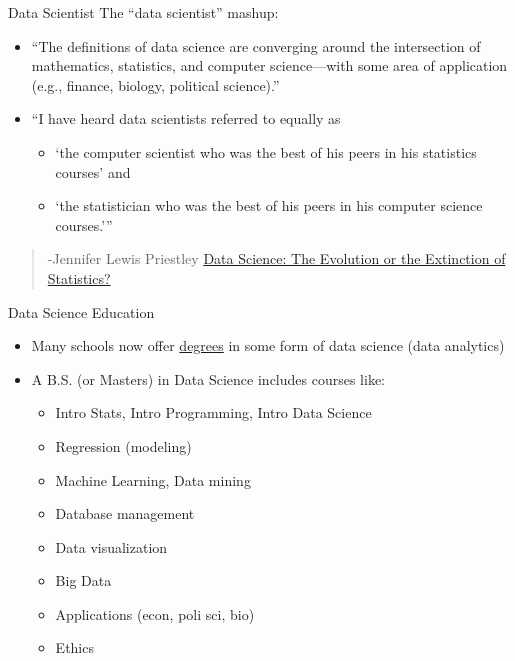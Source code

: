 \documentclass[
  10pt,
  ignorenonframetext,
]{beamer}
\providecommand{\tightlist}{%
  \setlength{\itemsep}{0pt}\setlength{\parskip}{0pt}}
\begin{document}
\begin{frame}{Data Scientist}
\protect\hypertarget{data-scientist}{}
The ``data scientist'' mashup:

\begin{itemize}
\tightlist
\item
  ``The definitions of data science are converging around the
  intersection of mathematics, statistics, and computer science---with
  some area of application (e.g., finance, biology, political
  science).''
\item
  ``I have heard data scientists referred to equally as

  \begin{itemize}
  \tightlist
  \item
    `the computer scientist who was the best of his peers in his
    statistics courses' and
  \item
    `the statistician who was the best of his peers in his computer
    science courses.'''
  \end{itemize}
\end{itemize}

\begin{quote}
-Jennifer Lewis Priestley
\href{http://magazine.amstat.org/blog/2016/01/01/data-science-the-evolution-or-the-extinction-of-statistics/}{Data
Science: The Evolution or the Extinction of Statistics?}
\end{quote}
\end{frame}

\begin{frame}{Data Science Education}
\protect\hypertarget{data-science-education}{}
\begin{itemize}
\tightlist
\item
  Many schools now offer
  \href{http://datascience.community/colleges}{degrees} in some form of
  data science (data analytics)
\item
  A B.S. (or Masters) in Data Science includes courses like:

  \begin{itemize}
  \tightlist
  \item
    Intro Stats, Intro Programming, Intro Data Science
  \item
    Regression (modeling)
  \item
    Machine Learning, Data mining
  \item
    Database management
  \item
    Data visualization
  \item
    Big Data
  \item
    Applications (econ, poli sci, bio)
  \item
    Ethics
  \end{itemize}
\end{itemize}
\end{frame}
\end{document}
